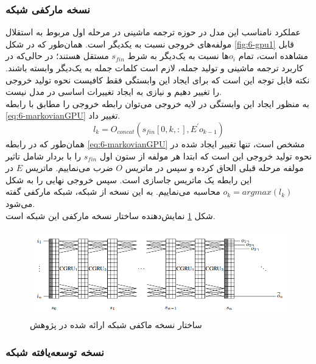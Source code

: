\subsubsection{نسخه مارکفی شبکه }
عملکرد نامناسب این مدل در حوزه ترجمه ماشینی در مرحله اول مربوط به استقلال مولفه‌های خروجی نسبت به یکدیگر است. همان‌طور که در شکل \ref{fig:6-gpu1} قابل مشاهده است، تمام $o_i$ها نسبت به یک‌دیگر به شرط $s_{fin}$ مستقل هستند؛ در حالی‌که در کاربرد ترجمه ماشینی و تولید جمله، لازم است کلمات جمله به یک‌دیگر وابسته باشند. نکته قابل توجه این است که برای ایجاد این وابستگی فقط کافیست نحوه تولید خروجی را تغییر دهیم و نیازی به ایجاد تغییرات اساسی در مدل نیست.
\\
به منظور ایجاد این وابستگی در لایه خروجی می‌توان رابطه خروجی را مطابق با رابطه \eqref{eq:6-markovianGPU} تغییر داد.
\begin{equation}
l_k = O_{concat}(s_{fin}[0,k,:], E^\prime o_{k-1})
\label{eq:6-markovianGPU}
\end{equation}
همان‌طور که در رابطه \eqref{eq:6-markovianGPU} مشخص است، تنها تغییر ایجاد شده در نحوه تولید خروجی این است که ابتدا هر مولفه از ستون اول $s_{fin}$ را با بردار شامل تاثیر مولفه مرحله قبلی الحاق کرده و سپس در ماتریس $O$ ضرب می‌نماییم. ماتریس $E$ در این رابطه یک ماتریس جاسازی است. سپس خروجی نهایی را به شکل $o_k = argmax(l_k)$ محاسبه می‌نماییم. به این نسخه از شبکه، شبکه مارکفی  گفته می‌شود.
\\
شکل \ref{fig:6-markovianGPU} نمایش‌دهنده ساختار نسخه مارکفی این شبکه است.
\begin{figure}[h]
\centering
\includegraphics[scale=0.5]{Imgs/markovianGPU.png}
\caption{ساختار نسخه ماکفی شبکه  ارائه شده در پژوهش \cite{lukas2017can}}
\label{fig:6-markovianGPU}
\end{figure}


\subsubsection{نسخه توسعه‌یافته شبکه }

